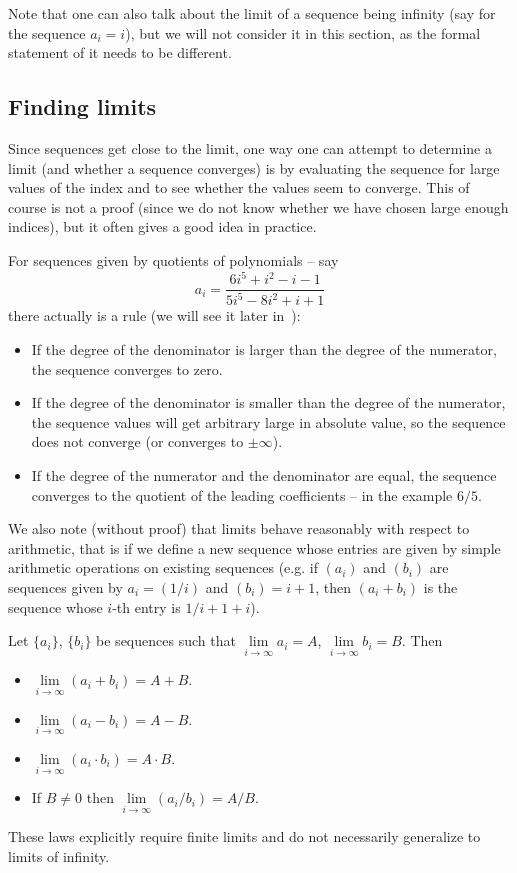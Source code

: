 Note that one can also talk about the limit of a sequence being infinity (say
for the sequence $a_i=i$), but we will not consider it in this section, as
the formal statement of it needs to be different.

\subsection{Finding limits}

Since sequences get close to the limit, one way one can attempt to determine a limit
(and whether a sequence converges) is by evaluating the sequence for large values of the
index and to see whether the values seem to converge. This of course is not a proof
(since we do not know whether we have chosen large enough indices), but it often gives a
good idea in practice.

For sequences given by quotients of polynomials -- say
\[
a_i=\frac{6i^5+i^2-i-1}{5i^5-8i^2+i+1}
\]
there actually is a rule (we will see it later in~):
\begin{itemize}
\item If the degree of the denominator is larger than the degree of the numerator, the
sequence converges to zero.
\item If the degree of the denominator is smaller than the degree of the numerator, the
sequence values will get arbitrary large in absolute value, so the sequence does not
converge (or converges to $\pm\infty$).
\item If the degree of the numerator and the denominator are equal, the
sequence converges to the quotient of the leading coefficients -- in the
example $6/5$.
\end{itemize}

We also note (without proof) that limits behave reasonably with respect to
arithmetic, that is if we define a new sequence whose entries are given by
simple arithmetic operations on existing sequences (e.g. if $(a_i)$ and
$(b_i)$ are sequences given by $a_i=(1/i)$ and
$(b_i)=i+1$, then $(a_i+b_i)$ is the sequence whose $i$-th entry is
$1/i+1+i$).
\begin{lemma}
\label{limitlaws}
Let $\{a_i\}$, $\{b_i\}$ be sequences such that
$\lim\limits_{i\to\infty} a_i=A$,
$\lim\limits_{i\to\infty} b_i=B$. Then
\begin{itemize}
\item $\lim\limits_{i\to\infty} (a_i+b_i)=A+B$.
\item $\lim\limits_{i\to\infty} (a_i-b_i)=A-B$.
\item $\lim\limits_{i\to\infty} (a_i\cdot b_i)=A\cdot B$.
\item If $B\not=0$ then $\lim\limits_{i\to\infty} (a_i/b_i)=A/B$.
\end{itemize}
\end{lemma}
These laws explicitly require finite limits and do not necessarily generalize
to limits of infinity.

